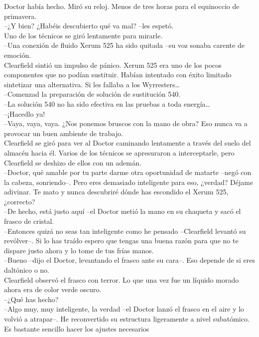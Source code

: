 Doctor había hecho. Miró su reloj. Menos de tres horas para el
equinoccio de primavera.\\
--¿Y bien? ¿Habéis descubierto qué va mal? --les espetó.\\
Uno de los técnicos se giró lentamente para mirarle.\\
--Una conexión de fluido Xerum 525 ha sido quitada --su voz sonaba
carente de emoción.\\
Clearfield sintió un impulso de pánico. Xerum 525 era uno de los pocos
componentes que no podían sustituir. Habían intentado con éxito limitado
sintetizar una alternativa. Si les fallaba a los Wyrresters\ldots{}\\
--Comenzad la preparación de solución de sustitución 540.\\
--La solución 540 no ha sido efectiva en las pruebas a toda
energía\ldots{}\\
--¡Hacedlo ya!\\
--Vaya, vaya, vaya. ¿Nos ponemos bruscos con la mano de obra? Eso nunca
va a provocar un buen ambiente de trabajo.\\
Clearfield se giró para ver al Doctor caminando lentamente a través del
suelo del almacén hacia él. Varios de los técnicos se apresuraron a
interceptarle, pero Clearfield se deshizo de ellos con un ademán.\\
--Doctor, qué amable por tu parte darme otra oportunidad de matarte
--negó con la cabeza, sonriendo--. Pero eres demasiado inteligente para
eso, ¿verdad? Déjame adivinar. Te mato y nunca descubriré dónde has
escondido el Xerum 525, ¿correcto?\\
--De hecho, está justo aquí --el Doctor metió la mano en su chaqueta y
sacó el frasco de cristal.\\
--Entonces quizá no seas tan inteligente como he pensado --Clearfield
levantó su revólver--. Si lo has traído espero que tengas una buena
razón para que no te dispare justo ahora y lo tome de tus frías manos.\\
--Bueno --dijo el Doctor, levantando el frasco ante su cara--. Eso
depende de si eres daltónico o no.\\
Clearfield observó el frasco con terror. Lo que una vez fue un líquido
morado ahora era de color verde oscuro.\\
--¿Qué has hecho?\\
--Algo muy, muy inteligente, la verdad --el Doctor lanzó el frasco en el
aire y lo volvió a atrapar--. He reconvertido su estructura ligeramente
a nivel subatómico. Es bastante sencillo hacer los ajustes necesarios
